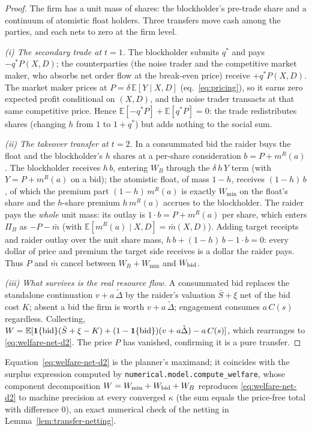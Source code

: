 \documentclass[11pt]{article}
\newcommand{\E}{\mathbb{E}}
\newcommand{\1}{\mathbf{1}}
\begin{document}
\begin{proof}
The firm has a unit mass of shares: the blockholder's pre-trade share and a
continuum of atomistic float holders. Three transfers move cash among the
parties, and each nets to zero at the firm level.

\emph{(i) The secondary trade at $t=1$.} The blockholder submits $q^{\ast}$ and
pays $-q^{\ast}P(X,D)$; the counterparties (the noise trader and the competitive
market maker, who absorbs net order flow at the break-even price) receive
$+q^{\ast}P(X,D)$. The market maker prices at $P=\delta\,\E[Y\mid X,D]$
(eq.~\eqref{eq:pricing}), so it earns zero expected profit conditional on
$(X,D)$, and the noise trader transacts at that same competitive price. Hence
$\E[-q^{\ast}P]+\E[q^{\ast}P]=0$: the trade redistributes shares (changing $h$
from $1$ to $1+q^{\ast}$) but adds nothing to the social sum.

\emph{(ii) The takeover transfer at $t=2$.} In a consummated bid the raider buys
the float and the blockholder's $h$ shares at a per-share consideration
$b=P+m^{R}(a)$. The blockholder receives $h\,b$, entering $W_B$ through the
$\delta\,h\,Y$ term (with $Y=P+m^R(a)$ on a bid); the atomistic float, of mass
$1-h$, receives $(1-h)\,b$, of which the premium part $(1-h)\,m^{R}(a)$ is exactly
$W_{\min}$ on the float's share and the $h$-share premium $h\,m^{R}(a)$ accrues
to the blockholder. The raider pays the \emph{whole} unit mass: its outlay is
$1\cdot b=P+m^{R}(a)$ per share, which enters $\Pi_B$ as $-P-\bar m$ (with
$\E[m^R(a)\mid X,D]=\bar m(X,D)$). Adding target receipts and raider outlay over
the unit share mass, $h\,b+(1-h)\,b-1\cdot b=0$: every dollar of price and
premium the target side receives is a dollar the raider pays. Thus $P$ and
$\bar m$ cancel between $W_B+W_{\min}$ and $W_{\textup{bid}}$.

\emph{(iii) What survives is the real resource flow.} A consummated bid replaces
the standalone continuation $v+a\,\tilde\Delta$ by the raider's valuation
$\bar S+\xi$ net of the bid cost $K$; absent a bid the firm is worth
$v+a\,\tilde\Delta$; engagement consumes $a\,C(s)$ regardless. Collecting,
$W=\E[\1\{\textup{bid}\}(\bar S+\xi-K)+(1-\1\{\textup{bid}\})(v+a\tilde\Delta)
   -a\,C(s)]$, which rearranges to \eqref{eq:welfare-net-d2}. The price $P$ has
vanished, confirming it is a pure transfer.
\end{proof}

Equation~\eqref{eq:welfare-net-d2} is the planner's maximand; it coincides with
the surplus expression computed by \texttt{numerical.model.compute\_welfare},
whose component decomposition $W=W_{\min}+W_{\textup{bid}}+W_B$ reproduces
\eqref{eq:welfare-net-d2} to machine precision at every converged $\kappa$ (the
sum equals the price-free total with difference $0$), an exact numerical check of
the netting in Lemma~\ref{lem:transfer-netting}.
\end{document}
